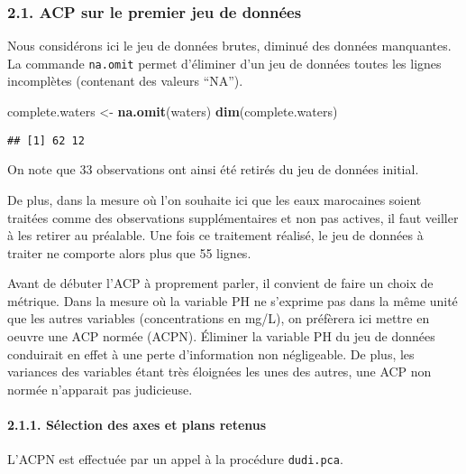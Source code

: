 \documentclass[]{article}
\newenvironment{Shaded}{\begin{snugshade}}{\end{snugshade}}
\newcommand{\KeywordTok}[1]{\textcolor[rgb]{0.13,0.29,0.53}{\textbf{#1}}}
\newcommand{\StringTok}[1]{\textcolor[rgb]{0.31,0.60,0.02}{#1}}
\newcommand{\NormalTok}[1]{#1}
\let\oldparagraph\paragraph
\renewcommand{\paragraph}[1]{\oldparagraph{#1}\mbox{}}
\begin{document}
\hypertarget{acp-sur-le-premier-jeu-de-donnees}{\subsubsection{2.1. ACP
sur le premier jeu de données}\label{acp-sur-le-premier-jeu-de-donnees}}

Nous considérons ici le jeu de données brutes, diminué des données
manquantes. La commande \texttt{na.omit} permet d'éliminer d'un jeu de
données toutes les lignes incomplètes (contenant des valeurs ``NA'').

\begin{Shaded}
\begin{Highlighting}[]
\NormalTok{complete.waters <-}\StringTok{ }\KeywordTok{na.omit}\NormalTok{(waters)}
\KeywordTok{dim}\NormalTok{(complete.waters)}
\end{Highlighting}
\end{Shaded}

\begin{verbatim}
## [1] 62 12
\end{verbatim}

On note que 33 observations ont ainsi été retirés du jeu de données
initial.

De plus, dans la mesure où l'on souhaite ici que les eaux marocaines
soient traitées comme des observations supplémentaires et non pas
actives, il faut veiller à les retirer au préalable. Une fois ce
traitement réalisé, le jeu de données à traiter ne comporte alors plus
que 55 lignes.

Avant de débuter l'ACP à proprement parler, il convient de faire un
choix de métrique. Dans la mesure où la variable PH ne s'exprime pas
dans la même unité que les autres variables (concentrations en mg/L), on
préfèrera ici mettre en oeuvre une ACP normée (ACPN). Éliminer la
variable PH du jeu de données conduirait en effet à une perte
d'information non négligeable. De plus, les variances des variables
étant très éloignées les unes des autres, une ACP non normée n'apparait
pas judicieuse.

\hypertarget{selection-des-axes-et-plans-retenus}{\paragraph{2.1.1.
Sélection des axes et plans
retenus}\label{selection-des-axes-et-plans-retenus}}

L'ACPN est effectuée par un appel à la procédure \texttt{dudi.pca}.
\end{document}
